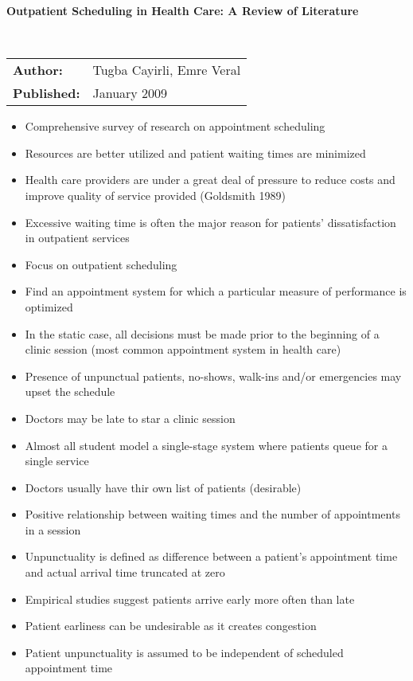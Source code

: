 \documentclass{article}
\begin{document}
\textbf{Outpatient Scheduling in Health Care: A Review of Literature}

\ \newline

\begin{tabular}{l l}
    \textbf{Author:} & Tugba Cayirli, Emre Veral \\
    \textbf{Published:} & January 2009 \\
\end{tabular}

\begin{itemize}
	\item Comprehensive survey of research on appointment scheduling
    \item Resources are better utilized and patient waiting times are minimized
    \item Health care providers are under a great deal of pressure to reduce costs and improve quality of service provided (Goldsmith 1989)
    \item Excessive waiting time is often the major reason for patients' dissatisfaction in outpatient services
    \item Focus on outpatient scheduling
    \item Find an appointment system for which a particular measure of performance is optimized
    \item In the static case, all decisions must be made prior to the beginning of a clinic session (most common appointment system in health care)
    \item Presence of unpunctual patients, no-shows, walk-ins and/or emergencies may upset the schedule
    \item Doctors may be late to star a clinic session
    \item Almost all student model a single-stage system where patients queue for a single service
    \item Doctors usually have thir own list of patients (desirable)
    \item Positive relationship between waiting times and the number of appointments in a session
    \item Unpunctuality is defined as difference between a patient's appointment time and actual arrival time truncated at zero
    \item Empirical studies suggest patients arrive early more often than late
    \item Patient earliness can be undesirable as it creates congestion
    \item Patient unpunctuality is assumed to be independent of scheduled appointment time

\end{itemize}
\end{document}
